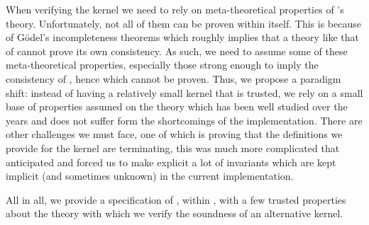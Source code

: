 When verifying the kernel we need to rely on meta-theoretical properties of
\Coq's theory. Unfortunately, not all of them can be proven within \Coq itself.
%
This is because of Gödel's incompleteness theorems which roughly implies that a
theory like that of \Coq cannot prove its own consistency. As such, we need to
assume some of these meta-theoretical properties, especially those strong enough
to imply the consistency of \Coq, hence which cannot be proven.
Thus, we propose a paradigm shift: instead of having a relatively small kernel
that is trusted, we rely on a small base of properties assumed on the theory
which has been well studied over the years and does not suffer form the
shortcomings of the implementation.
There are other challenges we must face, one of which is proving that the
definitions we provide for the kernel are terminating, this was much more
complicated that anticipated and forced us to make explicit a lot of invariants
which are kept implicit (and sometimes unknown) in the current implementation.

All in all, we provide a specification of \Coq, within \Coq, with a few trusted
properties about the theory with which we verify the soundness of an alternative
\Coq kernel.